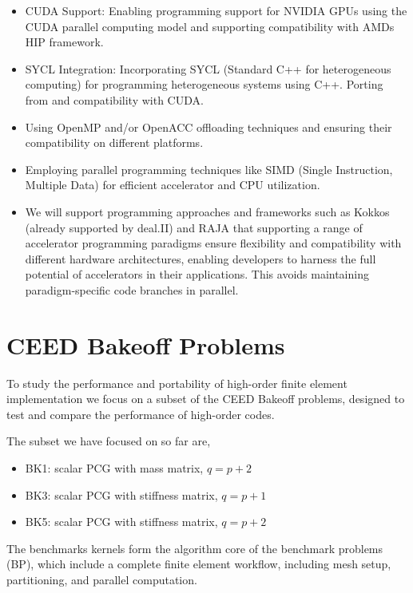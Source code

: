 \documentclass[a4paper,12pt]{article}
\begin{document}
\begin{itemize}
\item CUDA Support: Enabling programming support for NVIDIA GPUs using the CUDA parallel computing model and
supporting compatibility with AMDs HIP framework.
\item SYCL Integration: Incorporating SYCL (Standard C++ for heterogeneous computing) for programming heterogeneous
systems using C++. Porting from and compatibility with CUDA.
\item Using OpenMP and/or OpenACC offloading techniques and ensuring their compatibility on different
platforms.
\item Employing parallel programming techniques like SIMD (Single Instruction, Multiple Data) for efficient accelerator
and CPU utilization.
\item We will support programming approaches and frameworks such as Kokkos (already supported by deal.II) and RAJA
that supporting a range of accelerator programming paradigms ensure flexibility and compatibility with different
hardware architectures, enabling developers to harness the full potential of accelerators in their applications. This avoids maintaining paradigm-specific code branches in parallel.
\end{itemize}

\newpage

\section{CEED Bakeoff Problems}

To study the performance and portability of high-order finite element implementation we focus on a subset of the CEED Bakeoff problems, designed to test and compare
the performance of high-order codes.

The subset we have focused on so far are,
\begin{itemize}
    \item BK1: scalar PCG with mass matrix, $q = p+2$
    \item BK3: scalar PCG with stiffness matrix, $q = p+1$
    \item BK5: scalar PCG with stiffness matrix, $q = p+2$
\end{itemize}
The benchmarks kernels form the algorithm core of the benchmark problems (BP), which include a complete finite element workflow, including mesh setup, partitioning, and parallel computation.
\end{document}
